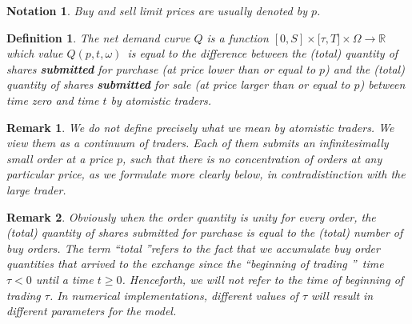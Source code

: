 \documentclass{article}
\newtheorem{definition}{Definition}
\newtheorem{remark}{Remark}
\newtheorem{notation}{Notation}
\begin{document}


\begin{notation}
Buy and sell limit prices are usually denoted by $p$.
\end{notation}



\begin{definition}
The net demand curve $Q$ is a function $[0,S]\times \mathbb{[\tau },T]\times
\Omega \mathbb{\rightarrow R}$ which value $Q(p,t,\omega )$\ is equal to the
difference between the (total) quantity of shares \textbf{submitted} for
purchase (at price lower than or equal to $p$) and the (total) quantity of
shares \textbf{submitted} for sale (at price larger than or equal to $p$)
between time zero and time $t$ by atomistic traders.
\end{definition}



\begin{remark}
We do not define precisely what we mean by atomistic traders. We view them
as a continuum of traders. Each of them submits an infinitesimally small
order at a price $p$, such that there is no concentration of orders at any
particular price, as we formulate more clearly below, in contradistinction
with the large trader.
\end{remark}



\begin{remark}
Obviously when the order quantity is unity for every order, the (total)
quantity of shares submitted for purchase is equal to the (total) number of
buy orders. The term \textquotedblleft total \textquotedblright refers to
the fact that we accumulate buy order quantities that arrived to the
exchange since the \textquotedblleft beginning of trading
\textquotedblright\ time $\tau <0$ until a time $t\geq 0$. Henceforth, we
will not refer to the time of beginning of trading $\tau $. In numerical
implementations, different values of $\tau $ will result in different
parameters for the model.
\end{remark}


\end{document}
